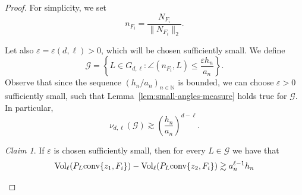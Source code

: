 \documentclass[10pt]{amsart}
\newcommand{\1}{\textbf{1}}
\newcommand{\conv}{{\rm conv}}
\newcommand{\vol}{{\rm Vol}}
\numberwithin{equation}{section} %
\theoremstyle{remark}
\newtheorem{claim}{Claim}
\theoremstyle{definition}
\begin{document}
\begin{proof}
     For simplicity, we set \[n_{F_i}=\frac{N_{F_i}}{\|N_{F_i}\|_2}.\]

      Let also $\varepsilon=\varepsilon(d,\ell)>0$, which will be chosen sufficiently small. We define \[\mathcal{G}=\left\{ L \in G_{d,\ell}: \angle(n_{F_i},L) \leq  \frac{\varepsilon h_n}{a_n}\right\}.\] Observe that since the sequence $(h_n/a_n)_{n \in \mathbb{N}}$ is bounded, we can choose $\varepsilon>0$ sufficiently small, such that Lemma~\ref{lem:small-angles-measure} holds true for $\mathcal{G}$. In particular, \begin{equation}\label{eq:G-lower-bound}
     \nu_{d,\ell}(\mathcal{G}) \gtrsim \left(\frac{h_n}{a_n}\right)^{d-\ell}.
     \end{equation}

     \begin{claim}\label{claim:subspaces-near-NF}
         If $\varepsilon$ is chosen sufficiently small, then for every $L \in \mathcal{G}$ we have that \[\vol_{\ell}(P_{L} \conv\{z_1,F_i\}) - \vol_{\ell}(P_{L} \conv\{z_2,F_i\}) \gtrsim a_n^{\ell-1}h_n\]
     \end{claim}


\end{proof}
\end{document}
